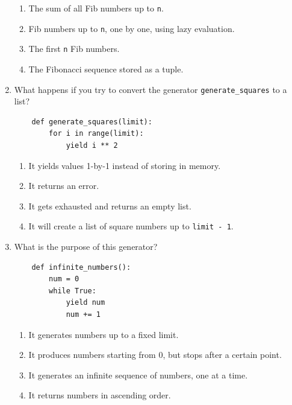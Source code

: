\documentclass[oneside,11pt,dvipsnames]{book}
\newcommand{\code}[1]{\texttt{#1}}
\begin{document}
\begin{enumerate}
\begin{enumerate}
    \item The sum of all Fib numbers up to \texttt{n}.
    \item Fib numbers up to \texttt{n}, one by one, using lazy evaluation.
    \item The first \texttt{n} Fib numbers.
    \item The Fibonacci sequence stored as a tuple.
\end{enumerate}


\item What happens if you try to convert the generator \texttt{generate\_squares} to a list?

\begin{lstlisting}
    def generate_squares(limit):
        for i in range(limit):
            yield i ** 2
    \end{lstlisting}

\begin{enumerate}
    \item It yields values 1-by-1 instead of storing in memory.
    \item It returns an error.
    \item It gets exhausted and returns an empty list.
    \item It will create a list of square numbers up to \code{limit - 1}.
\end{enumerate}



\item What is the purpose of this generator?
\begin{lstlisting}
    def infinite_numbers():
        num = 0
        while True:
            yield num
            num += 1
    \end{lstlisting}
\begin{enumerate}
    \item It generates numbers up to a fixed limit.
    \item It produces numbers starting from 0, but stops after a certain point.
    \item It generates an infinite sequence of numbers, one at a time.
    \item It returns numbers in ascending order.
\end{enumerate}

\end{enumerate}
\end{document}
